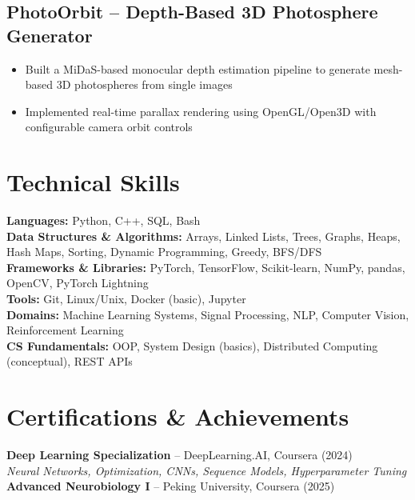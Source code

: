 \documentclass[a4paper,11pt]{article}
\begin{document}
\subsection{PhotoOrbit -- Depth-Based 3D Photosphere Generator}
\begin{itemize}[leftmargin=15pt, itemsep=1pt]
    \item Built a MiDaS-based monocular depth estimation pipeline to generate mesh-based 3D photospheres from single images
    \item Implemented real-time parallax rendering using OpenGL/Open3D with configurable camera orbit controls
\end{itemize}

\section{Technical Skills}
\textbf{Languages:} Python, C++, SQL, Bash \\
\textbf{Data Structures \& Algorithms:} Arrays, Linked Lists, Trees, Graphs, Heaps, Hash Maps, Sorting, Dynamic Programming, Greedy, BFS/DFS \\
\textbf{Frameworks \& Libraries:} PyTorch, TensorFlow, Scikit-learn, NumPy, pandas, OpenCV, PyTorch Lightning \\
\textbf{Tools:} Git, Linux/Unix, Docker (basic), Jupyter \\
\textbf{Domains:} Machine Learning Systems, Signal Processing, NLP, Computer Vision, Reinforcement Learning \\
\textbf{CS Fundamentals:} OOP, System Design (basics), Distributed Computing (conceptual), REST APIs

\section{Certifications \& Achievements}
\textbf{Deep Learning Specialization} -- DeepLearning.AI, Coursera (2024) \\
\textit{Neural Networks, Optimization, CNNs, Sequence Models, Hyperparameter Tuning} \\[3pt]
\textbf{Advanced Neurobiology I} -- Peking University, Coursera (2025)
\end{document}
